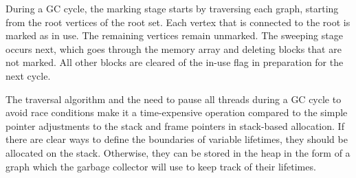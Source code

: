 \documentclass[11pt, letterpaper]{report}
\begin{document}
During a GC cycle, the marking stage starts by traversing each graph, starting from the root vertices of the root set. Each vertex that is connected to the root is marked as in use. The remaining vertices remain unmarked. The sweeping stage occurs next, which goes through the memory array and deleting blocks that are not marked. All other blocks are cleared of the in-use flag in preparation for the next cycle. \cite{geeksforgeeks.org}

The traversal algorithm and the need to pause all threads during a GC cycle to avoid race conditions make it a time-expensive operation compared to the simple pointer adjustments to the stack and frame pointers in stack-based allocation. If there are clear ways to define the boundaries of variable lifetimes, they should be allocated on the stack. Otherwise, they can be stored in the heap in the form of a graph which the garbage collector will use to keep track of their lifetimes.

\clearpage
{}
\printbibliography[heading=none]
\end{document}
